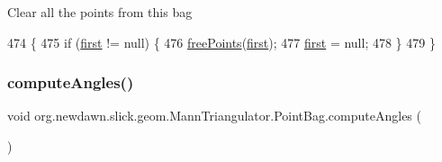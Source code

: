 Clear all the points from this bag 
\begin{DoxyCode}
474                             \{
475             \textcolor{keywordflow}{if} (\mbox{\hyperlink{classorg_1_1newdawn_1_1slick_1_1geom_1_1_mann_triangulator_1_1_point_bag_a120e5163711d94563be103af953fe059}{first}} != null) \{
476                 \mbox{\hyperlink{classorg_1_1newdawn_1_1slick_1_1geom_1_1_mann_triangulator_a89a455a22b02af6f023dc3411b430909}{freePoints}}(\mbox{\hyperlink{classorg_1_1newdawn_1_1slick_1_1geom_1_1_mann_triangulator_1_1_point_bag_a120e5163711d94563be103af953fe059}{first}});
477                 \mbox{\hyperlink{classorg_1_1newdawn_1_1slick_1_1geom_1_1_mann_triangulator_1_1_point_bag_a120e5163711d94563be103af953fe059}{first}} = null;
478             \}
479         \}
\end{DoxyCode}
\mbox{\label{classorg_1_1newdawn_1_1slick_1_1geom_1_1_mann_triangulator_1_1_point_bag_a718c1b78b0745ea72f661d00882250a3}} 
\subsubsection{\texorpdfstring{compute\+Angles()}{computeAngles()}}
{\footnotesize\ttfamily void org.\+newdawn.\+slick.\+geom.\+Mann\+Triangulator.\+Point\+Bag.\+compute\+Angles (\begin{DoxyParamCaption}{ }\end{DoxyParamCaption})\hspace{0.3cm}{\ttfamily [inline]}}

